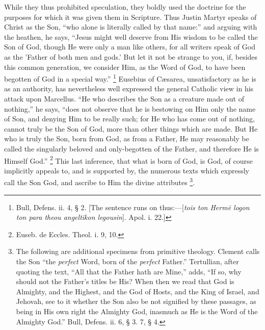 While they thus prohibited speculation, they boldly used the
doctrine for the purposes for which it was given them in Scripture.
Thus Justin Martyr speaks of Christ as the Son, ``who alone is
literally called by that name:'' and arguing with the heathen, he
says, ``Jesus might well deserve from His wisdom to be
called the Son of God, though He were only a man like others, for all
writers speak of God as the 'Father of both men and gods.' But let it
not be strange to you, if, besides this common generation, we consider
Him, as the Word of God, to have been begotten of God in a special
way.'' \footnote{Bull, Defens. ii. 4, § 2. [The sentence
runs on thus:—[\emph{tois ton Herm\={e} logon ton para theou
angeltikon legousin}]. Apol. i. 22.]} Eusebius of
Cæsarea, unsatisfactory as he is as an authority, has nevertheless
well expressed the general Catholic view in his attack upon Marcellus.
``He who describes the Son as a creature made out of
nothing,'' he says, ``does not observe that he is bestowing on
Him only the name of Son, and denying Him to be really such; for He
who has come out of nothing, cannot truly be the Son of God, more than
other things which are made. But He who is truly the Son, born from
God, as from a Father, He may reasonably be called the singularly
beloved and only-begotten of the Father, and therefore He is Himself
God.'' \footnote{Euseb. de Eccles. Theol. i. 9, 10.} This last
inference, that what is born of God, is God, of course implicitly
appeals to, and is supported by, the numerous texts which expressly
call the Son God, and ascribe to Him the divine attributes \footnote{The following are additional specimens
from primitive theology. Clement calls the Son ``the \emph{perfect}
Word, born of the \emph{perfect} Father.'' Tertullian, after quoting the
text, ``All that the Father hath are Mine,'' adds, ``If
so, why should not the Father's titles be His? When then we read that
God is Almighty, and the Highest, and the God of Hosts, and the King
of Israel, and Jehovah, see to it whether the Son also be not
signified by these passages, as being in His own right the Almighty
God, inasmuch as He is the Word of the Almighty God.'' Bull,
Defens. ii. 6, § 3. 7, § 4.}.

